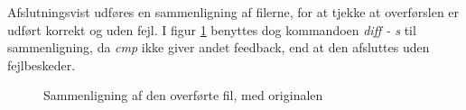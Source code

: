  Afslutningsvist udføres en sammenligning af filerne, for at tjekke at overførslen er udført korrekt og uden fejl. I figur \ref{fig:compare}  benyttes dog kommandoen \textit{diff - s} til sammenligning, da \textit{cmp} ikke giver andet feedback, end at den afsluttes uden fejlbeskeder. 
 
 \begin{figure}[h!]
 	\centering
 	\caption{Sammenligning af den overførte fil, med originalen}
 	\label{fig:compare}
 \end{figure}